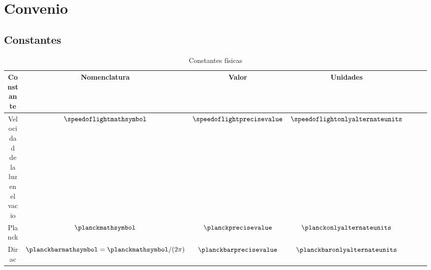 \chapter[Convenio]{Convenio}
\section{Constantes}\label{sec:constantes}
\begin{table}[htbp]
    \caption{Constantes físicas\label{tab:constantes_fisicas}}
    \centering
    \begin{tabular}{ccccccc}
        \toprule
        Constante & Nomenclatura & Valor & Unidades\\
        \midrule
        Velocidad de la luz en el vacio & $\speedoflightmathsymbol$ & $\speedoflightprecisevalue$ & $\speedoflightonlyalternateunits$\\
        Planck & $\planckmathsymbol$ & $\planckprecisevalue$ & $\planckonlyalternateunits$\\
        Dirac & $\planckbarmathsymbol=\planckmathsymbol/(2\pi)$ & $\planckbarprecisevalue$ & $\planckbaronlyalternateunits$\\
        \bottomrule
    \end{tabular}
\end{table}
